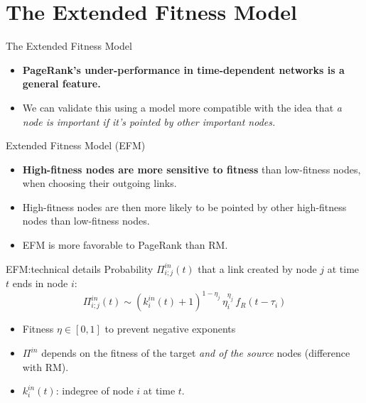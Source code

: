 \section{The Extended Fitness Model}

\begin{frame}{The Extended Fitness Model}
    \begin{itemize}
        \item \textbf{PageRank's under-performance in time-dependent networks is a general feature.}
        \item We can validate this using a model more compatible with the idea that \emph{a node is important if it's pointed by other important nodes.}
    \end{itemize}
    \begin{center}
        \alert{Extended Fitness Model} (EFM)
    \end{center}
    \begin{itemize}
        \item \textbf{High-fitness nodes are more sensitive to fitness} than low-fitness nodes, when choosing their outgoing links.
        \item High-fitness nodes are then more likely to be pointed by other high-fitness nodes than low-fitness nodes.
        \item EFM is \alert{more favorable} to PageRank than RM.
    \end{itemize}
\end{frame}

\begin{frame}{EFM:\@ technical details}
    Probability $\Pi_{i;j}^{in}(t)$ that a link created by node $j$ at time $t$ ends in node $i$:
    \[
        \Pi_{i;j}^{in}(t) \sim (k_i^{in}(t)+1)^{1-\eta_j} \, \eta_i^{\eta_j} \, f_R(t-\tau_i)
    \]
    \begin{itemize}
        \item Fitness $\eta \in [0, 1]$ to prevent negative exponents
        \item $\Pi^{in}$ depends on the fitness of the target \emph{and of the source} nodes (difference with RM).
        \item $k_i^{in}(t)$: indegree of node $i$ at time $t$.
    \end{itemize}
\end{frame}

